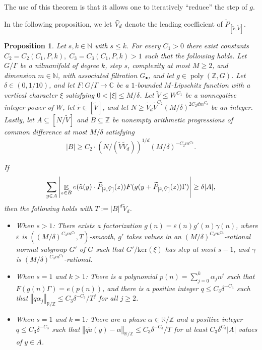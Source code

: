\documentclass[11pt]{amsart}
\newtheorem{proposition}[lemma]{Proposition}
\theoremstyle{definition}
\DeclareMathOperator*{\E}{\mathbb{E}}
\newcommand{\N}{{\mathbb N}}
\newcommand{\Z}{{\mathbb Z}}
\newcommand{\norm}[1]{\left\Vert #1\right\Vert}
\DeclareMathOperator{\poly}{poly}
\newcommand{\veps}{\varepsilon}
\begin{document}
The use of this theorem is that it allows one to iteratively ``reduce'' the step of $g$.


In the following proposition, we let $\Tilde{V}_d$ denote the leading coefficient of $\widetilde{P}_{[\tilde{r},\tilde{V}]}$.

\begin{proposition}\label{prop:Wtricknilsequenceprop}
Let $s,k\in\N$ with $s\leq k$. For every $C_1>0$ there exist constants $C_2=C_2(C_1, P, k),\; C_3=C_3(C_1, P, k)>1$ such that the following holds. Let $G/\Gamma$ be a nilmanifold of degree $k$, step $s$, complexity at most $M \geq 2$, and dimension $m\in\N$, with associated filtration $G_\bullet$, and let $g\in\poly(\Z, G)$.  Let $\delta\in(0, 1/10)$, and let $F:G/\Gamma \to \mathbb{C}$ be a $1$-bounded $M$-Lipschitz function with a vertical character $\xi$ satisfying $0<|\xi| \leq M/\delta$.  
Let $\tilde{V} \leq  W^{C_1}$ be a nonnegative integer power of $W$, let $\tilde{r}\in[\tilde{V}]$, and let 
$N\geq \tilde{V}_d \tilde{V}^{C_2} (M/\delta)^{2C_2 dm^{C_2}}$ be an integer.  Lastly, let $A \subseteq [N/\tilde{V}]$ and $B \subseteq \Z$ be nonempty arithmetic progressions of common difference at most $M/\delta$ satisfying 
\begin{align}\label{E: bound on B} 
   |B| \geq C_2\cdot(N/(\tilde{V}\tilde{V}_d))^{1/d}(M/\delta)^{-C_2 m^{C_2}}.
\end{align}
 
If
\begin{equation}\label{E:Wtricknilsequencehypothesis}
    \sum_{y\in A}\left|\E_{z \in B} e(\tilde{a}(y)\cdot\widetilde{P}_{[\tilde{r},\tilde{V}]}(z))F(g(y + \widetilde{P}_{[\tilde{r},\tilde{V}]}(z))\Gamma) \vphantom{\E_{z \in [(N/W_d)^{1/d}\tilde{V}^{-1}]}} \right| \geq  \delta |A|,
\end{equation}
then 
the following holds with $T:=|B|^d \tilde{V}_d$.
\begin{itemize}
    \item
 When $s>1$: There exists a factorization $g(n) = \veps(n)g'(n)\gamma(n)$, where $\veps$ is $((M/\delta)^{C_3m^{C_3}}, T)$-smooth, $g'$ takes values in an $(M/\delta)^{C_3m^{C_3}}$-rational normal subgroup $G'$ of $G$ such that $G'/\mathrm{ker}(\xi)$ has step at most $s - 1$, and $\gamma$ is $(M/\delta)^{C_3m^{C_3}}$-rational.
    \item When $s=1$ and $k>1$: There is a polynomial $p(n)=\sum_{j=0}^k \alpha_j n^j$ such that $F(g(n)\Gamma)=e(p(n))$, and there is a positive integer $q\leq C_3\delta^{-C_3}$ such that $\norm{q\alpha_j}_{\mathbb{R}/\mathbb{Z}} \leq C_3\delta^{-C_3}/T^j$ for all $j \geq 2$.
    \item When $s=1$ and $k=1$: There are a phase $\alpha \in \mathbb{R}/\mathbb{Z}$ and a positive integer $q \leq C_3\delta^{-C_3}$ such that $\norm{q\tilde{a}(y)-\alpha}_{\mathbb{R}/\mathbb{Z}} \leq C_3\delta^{-C_3}/T$ for at least {$C_3\delta^{C_3}|A|$} values of $y \in A$.
\end{itemize}
\end{proposition}
  
\end{document}
